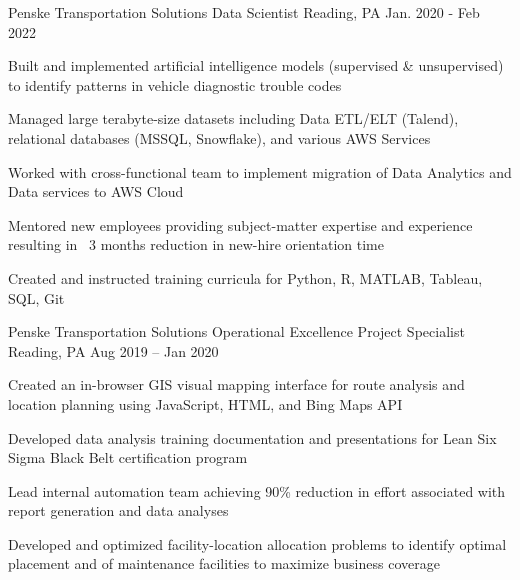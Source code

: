 \begin{cventries}
\cventry
{Penske Transportation Solutions} %
{Data Scientist} %
{Reading, PA} %
{Jan. 2020 - Feb 2022} %
{ %
\begin{cvitems}
\item {Built and implemented artificial intelligence models (supervised \& unsupervised) to identify patterns in vehicle diagnostic trouble codes }
\item {Managed large terabyte-size datasets including Data ETL/ELT (Talend), relational databases (MSSQL, Snowflake), and various AWS Services}
\item {Worked with cross-functional team to implement migration of Data Analytics and Data services to AWS Cloud}
\item {Mentored new employees providing subject-matter expertise and experience resulting in ~3 months reduction in new-hire orientation time}
\item {Created and instructed training curricula for Python, R, MATLAB, Tableau, SQL, Git}
\end{cvitems}
}


\cventry
{Penske Transportation Solutions} %
{Operational Excellence Project Specialist} %
{Reading, PA} %
{Aug 2019 – Jan 2020} %
{ %
\begin{cvitems}
\item {Created an in-browser GIS visual mapping interface for route analysis and location planning using JavaScript, HTML, and Bing Maps API}
\item {Developed data analysis training documentation and presentations for Lean Six Sigma Black Belt certification program}
\item {Lead internal automation team achieving 90\% reduction in effort associated with report generation and data analyses}
\item {Developed and optimized facility-location allocation problems to identify optimal placement and of maintenance facilities to maximize business coverage}
\end{cvitems}
}



\end{cventries}
